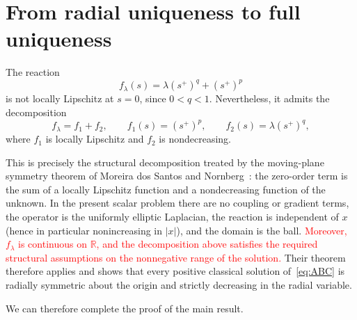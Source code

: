 \documentclass[11pt]{article}
\theoremstyle{definition}
\begin{document}
  
\section{From radial uniqueness to full uniqueness}

The reaction
\[
f_\lambda(s)
=
\lambda(s^+)^q+(s^+)^p
\]
is not locally Lipschitz at $s=0$, since $0<q<1$. Nevertheless, it
admits the decomposition
\[
f_\lambda=f_1+f_2,
\qquad
f_1(s)=(s^+)^p,
\qquad
f_2(s)=\lambda(s^+)^q,
\]
where $f_1$ is locally Lipschitz and $f_2$ is nondecreasing.

This is precisely the structural decomposition treated by the moving-plane
symmetry theorem of Moreira dos Santos and Nornberg~\cite{SantosNornberg}:
the zero-order term is the sum of a locally Lipschitz function and a
nondecreasing function of the unknown. In the present scalar problem there are
no coupling or gradient terms, the operator is the uniformly elliptic
Laplacian, the reaction is independent of $x$ (hence in particular
nonincreasing in $|x|$), and the domain is the ball.
\textcolor{red}{Moreover, $f_\lambda$ is continuous on $\mathbb R$,
and the decomposition above satisfies the required structural assumptions
on the nonnegative range of the solution.}
Their theorem therefore
applies and shows that every positive classical solution of~\eqref{eq:ABC}
is radially symmetric about the origin and strictly decreasing in the radial
variable.

We can therefore complete the proof of the main result.
\end{document}
